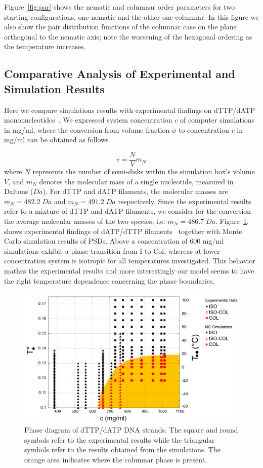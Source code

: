 \documentclass[aip,jcp, amsmath, amssymb, reprint]{revtex4-1}
\begin{document}
 Figure~\ref{fig:par} shows the nematic and columnar order parameters for two starting configurations, one nematic and the other one columnar. In this figure we also show the pair 
 distribution functions of the columnar case on the plane orthogonal to the nematic axis; note the worsening of the hexagonal ordering as the temperature increases.


\subsection{Comparative Analysis of Experimental and Simulation Results}

Here we compare simulations results with experimental findings on dTTP/dATP mononucleotides~\cite{Smith}.
We expressed system concentration $c$ of computer simulations in mg/ml, where the conversion 
from volume fraction $\phi$ to concentration $c$ in mg/ml can be obtained as follows

\begin{equation}
	c=\frac{N}{V}m_N
	\label{conc}
\end{equation}
where $N$ represents the number of semi-disks within the simulation box's volume $V$, and $m_N$ denotes the molecular mass of a single nucleotide, measured in Daltons ($Da$). For dTTP and dATP filaments, the molecular masses are $m_N=482.2\; Da$ and $m_N=491.2\; Da$ respectively. Since the experimental results refer to a mixture of dTTP and dATP filaments, we consider for
the conversion the average molecular masses of the two species, i.e. $m_N=486.7\; Da$. 
Figure~\ref{fig:wide}, shows experimental 
findings of dATP/dTTP filaments~\cite{Smith} together with Monte Carlo simulation results of PSDs. 
Above a concentration of 600 mg/ml simulations exhibit a phase transition from I to Col, whereas at lower concentration
system is isotropic for all temperatures investigated. This behavior mathes the experimental results and more interestingly
our model seems to have the right temperature dependence concerning the phase boundaries.

\begin{figure}[t!] \includegraphics[width=0.7\linewidth]{finaleeng.png} \caption{\label{fig:wide}Phase diagram of
    dTTP/dATP DNA strands. The square and round symbols refer to the experimental results while the triangular symbols
  refer to the results obtained from the simulations. The orange area indicates where the columnar phase is present.}
\end{figure}
\end{document}

